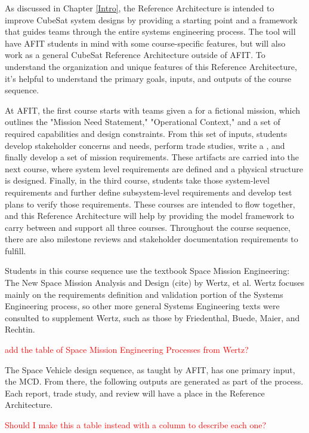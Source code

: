 As discussed in Chapter \ref{Intro}, the Reference Architecture is intended to improve CubeSat system designs by providing a starting point and a framework that guides teams through the entire systems engineering process. The tool will have AFIT students in mind with some course-specific features, but will also work as a general CubeSat Reference Architecture outside of AFIT. To understand the organization and unique features of this Reference Architecture, it's helpful to understand the primary goals, inputs, and outputs of the course sequence. 

At AFIT, the first course starts with teams given a  for a fictional mission, which outlines the "Mission Need Statement," "Operational Context," and a set of required capabilities and design constraints. From this set of inputs, students develop stakeholder concerns and needs, perform trade studies, write a , and finally develop a set of mission requirements. These artifacts are carried into the next course, where system level requirements are defined and a physical structure is designed. Finally, in the third course, students take those system-level requirements and further define subsystem-level requirements and develop test plans to verify those requirements. These courses are intended to flow together, and this Reference Architecture will help by providing the model framework to carry between and support all three courses. Throughout the course sequence, there are also milestone reviews and stakeholder documentation requirements to fulfill. 

Students in this course sequence use the textbook Space Mission Engineering: The New Space Mission Analysis and Design (cite) by Wertz, et al. Wertz focuses mainly on the requirements definition and validation portion of the Systems Engineering process, so other more general Systems Engineering texts were consulted to supplement Wertz, such as those by Friedenthal, Buede, Maier, and Rechtin. 

\textcolor{red}{add the table of Space Mission Engineering Processes from Wertz?}

The Space Vehicle design sequence, as taught by AFIT, has one primary input, the MCD. From there, the following outputs are generated as part of the process. Each report, trade study, and review will have a place in the Reference Architecture.

\textcolor{red}{Should I make this a table instead with a column to describe each one?}

